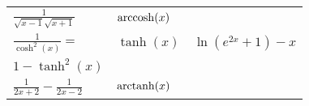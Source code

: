 \begin{tabular}{l | l | l}
    $\frac{1}{\sqrt{x-1}\sqrt{x+1}}$                                 & $\operatorname{arccosh}(x)$           & \\
    $\frac{1}{\cosh^2(x)} =$                                         & $\tanh(x)$              & $\ln(e^{2x} + 1) - x$\\
    $1 - \tanh^2(x)$                                                 &                         & \\
    $\frac{1}{2x+2} - \frac{1}{2x - 2}$                              & $\operatorname{arctanh}(x)$           & \\
\end{tabular}
